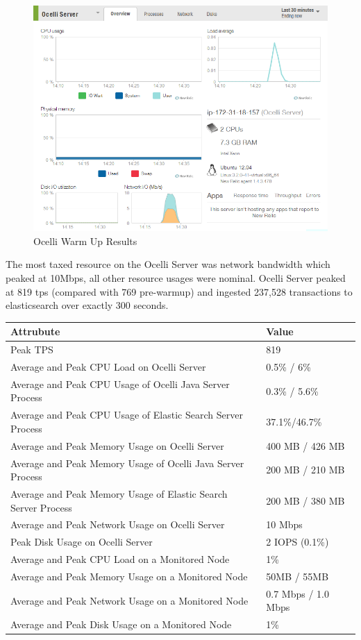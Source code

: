 \documentclass{llncs}
\begin{document}
\begin{figure}[h]
    \centering
    \includegraphics[scale=0.7]{app4}
    \caption{Ocelli Warm Up Results}
    \label{fig:ocelli_dm}
\end{figure}

The most taxed resource on the Ocelli Server was network bandwidth which peaked at 10Mbps, all other resource usages were nominal. Ocelli Server peaked at 819 tps (compared with 769 pre-warmup) and ingested 237,528 transactions to elasticsearch over exactly 300 seconds.

\begin{flushleft}
    \begin{tabular}{ | l | l |}
    \hline
  Attrubute & Value  \\ \hline
  Peak TPS & 819  \\ \hline
  Average and Peak CPU Load on Ocelli Server & 0.5\% / 6\%  \\ \hline
  Average and Peak CPU Usage of Ocelli Java Server Process & 0.3\% / 5.6\% \\ \hline
 Average and Peak CPU Usage of Elastic Search Server Process & 37.1\%/46.7\%	  \\ \hline
  Average and Peak Memory Usage on Ocelli Server & 400 MB / 426 MB	 \\ \hline
  Average and Peak Memory Usage of Ocelli Java Server Process &	200 MB / 210 MB		 \\ \hline
 Average and Peak Memory Usage of Elastic Search Server Process &	200 MB / 380 MB		 \\ \hline
Average and Peak Network Usage on Ocelli Server &	10 Mbps 	 \\ \hline
Peak Disk Usage on Ocelli Server &	2 IOPS (0.1\%) 		 \\ \hline
Average and Peak CPU Load on a Monitored Node& 	1\% 	 \\ \hline
  Average and Peak Memory Usage on a Monitored Node &	50MB / 55MB	 \\ \hline
Average and Peak Network Usage on a Monitored Node &	0.7 Mbps / 1.0 Mbps		 \\ \hline
  Average and Peak Disk Usage on a Monitored Node &  1\%	\\ 
    \hline
    \end{tabular}
\end{flushleft}
\end{document}
